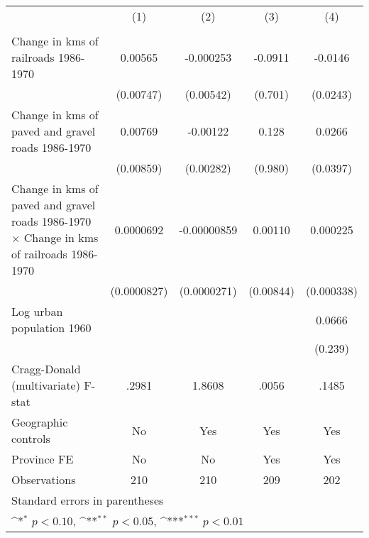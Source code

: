 {
\def\sym#1{\ifmmode^{#1}\else\(^{#1}\)\fi}
\begin{tabular}{l*{4}{c}}
\hline\hline
                &\multicolumn{1}{c}{(1)}&\multicolumn{1}{c}{(2)}&\multicolumn{1}{c}{(3)}&\multicolumn{1}{c}{(4)}\\
                &\multicolumn{1}{c}{}&\multicolumn{1}{c}{}&\multicolumn{1}{c}{}&\multicolumn{1}{c}{}\\
\hline
Change in kms of railroads 1986-1970&  0.00565         &-0.000253         &  -0.0911         &  -0.0146         \\
                &(0.00747)         &(0.00542)         &  (0.701)         & (0.0243)         \\
[1em]
Change in kms of paved and gravel roads 1986-1970&  0.00769         & -0.00122         &    0.128         &   0.0266         \\
                &(0.00859)         &(0.00282)         &  (0.980)         & (0.0397)         \\
[1em]
Change in kms of paved and gravel roads 1986-1970 $\times$ Change in kms of railroads 1986-1970&0.0000692         &-0.00000859         &  0.00110         & 0.000225         \\
                &(0.0000827)         &(0.0000271)         &(0.00844)         &(0.000338)         \\
[1em]
Log urban population 1960&                  &                  &                  &   0.0666         \\
                &                  &                  &                  &  (0.239)         \\
\hline
Cragg-Donald (multivariate) F-stat&    .2981         &   1.8608         &    .0056         &    .1485         \\
Geographic controls&       No         &      Yes         &      Yes         &      Yes         \\
Province FE     &       No         &       No         &      Yes         &      Yes         \\
Observations    &      210         &      210         &      209         &      202         \\
\hline\hline
\multicolumn{5}{l}{\footnotesize Standard errors in parentheses}\\
\multicolumn{5}{l}{\footnotesize \sym{*} \(p<0.10\), \sym{**} \(p<0.05\), \sym{***} \(p<0.01\)}\\
\end{tabular}
}
